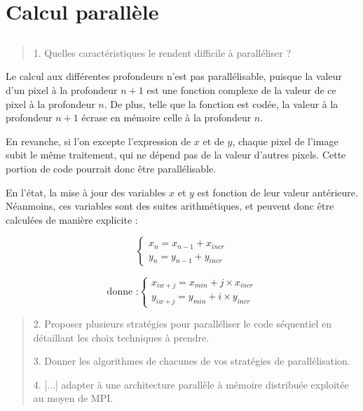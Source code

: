 \section{Calcul parallèle}

\subsection{}

\begin{quotation}
  1. Quelles caractéristiques le rendent difficile à paralléliser ?
\end{quotation}

Le calcul aux différentes profondeurs n'est pas parallélisable,
puisque la valeur d'un pixel à la profondeur $n+1$ est une fonction
complexe de la valeur de ce pixel à la profondeur $n$. De plus, telle
que la fonction est codée, la valeur à la profondeur $n+1$ écrase en
mémoire celle à la profondeur $n$.

En revanche, si l'on excepte l'expression de $x$ et de $y$, chaque
pixel de l'image subit le même traitement, qui ne dépend pas de la
valeur d'autres pixels. Cette portion de code pourrait donc être
parallélisable.

En l'état, la mise à jour des variables $x$ et $y$ est fonction de
leur valeur antérieure.  Néanmoins, ces variables sont des suites
arithmétiques, et peuvent donc être calculées de manière explicite :

\[ \begin{cases}
    x_n = x_{n-1} + x_{incr}\\
    y_n = y_{n-1} + y_{incr}
  \end{cases} \]

\[\textrm{donne :} \begin{cases}
    x_{i w + j} = x_{min} + j \times x_{incr}\\
    y_{i w + j} = y_{min} + i \times y_{incr}
  \end{cases} \]


\begin{quotation}
  2. Proposer plusieurs stratégies pour paralléliser le code
  séquentiel en détaillant les choix techniques à prendre.

  3. Donner les algorithmes de chacunes de vos stratégies de
  parallélisation.

  4. [...] adapter à une architecture parallèle à mémoire distribuée
  exploitée au moyen de MPI.
\end{quotation}

